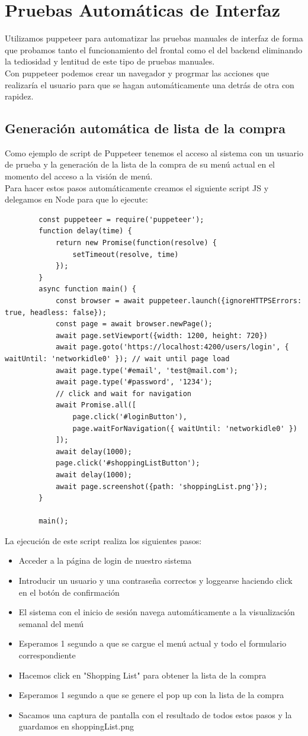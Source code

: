 \documentclass[12pt, a4paper, twoside]{book}
\begin{document}
	\section{Pruebas Automáticas de Interfaz}
	Utilizamos puppeteer para automatizar las pruebas manuales de interfaz de forma que probamos tanto el funcionamiento del frontal como el del backend eliminando la tediosidad y lentitud de este tipo de pruebas manuales.\\
	Con puppeteer podemos crear un navegador y progrmar las acciones que realizaría el usuario para que se hagan automáticamente una detrás de otra con rapidez.\\
	\subsection{Generación automática de lista de la compra}
	Como ejemplo de script de Puppeteer tenemos el acceso al sistema con un usuario de prueba y la generación de la lista de la compra de su menú actual en el momento del acceso a la visión de menú.\\
	Para hacer estos pasos automáticamente creamos el siguiente script JS y delegamos en Node para que lo ejecute:
	\begin{lstlisting}
		const puppeteer = require('puppeteer');
		function delay(time) {
			return new Promise(function(resolve) {
				setTimeout(resolve, time)
			});
		}
		async function main() {
			const browser = await puppeteer.launch({ignoreHTTPSErrors: true, headless: false});
			const page = await browser.newPage();
			await page.setViewport({width: 1200, height: 720})
			await page.goto('https://localhost:4200/users/login', { waitUntil: 'networkidle0' }); // wait until page load
			await page.type('#email', 'test@mail.com');
			await page.type('#password', '1234');
			// click and wait for navigation
			await Promise.all([
				page.click('#loginButton'),
				page.waitForNavigation({ waitUntil: 'networkidle0' })
			]);
			await delay(1000);
			page.click('#shoppingListButton');
			await delay(1000);
			await page.screenshot({path: 'shoppingList.png'});
		}
		
		main();		
	\end{lstlisting}
	La ejecución de este script realiza los siguientes pasos:
	\begin{itemize}
		\item Acceder a la página de login de nuestro sistema
		\item Introducir un usuario y una contraseña correctos y loggearse haciendo click en el botón de confirmación
		\item El sistema con el inicio de sesión navega automáticamente a la visualización semanal del menú
		\item Esperamos 1 segundo a que se cargue el menú actual y todo el formulario correspondiente
		\item Hacemos click en "Shopping List" para obtener la lista de la compra
		\item Esperamos 1 segundo a que se genere el pop up con la lista de la compra
		\item Sacamos una captura de pantalla con el resultado de todos estos pasos y la guardamos en shoppingList.png
	\end{itemize}
\end{document}
